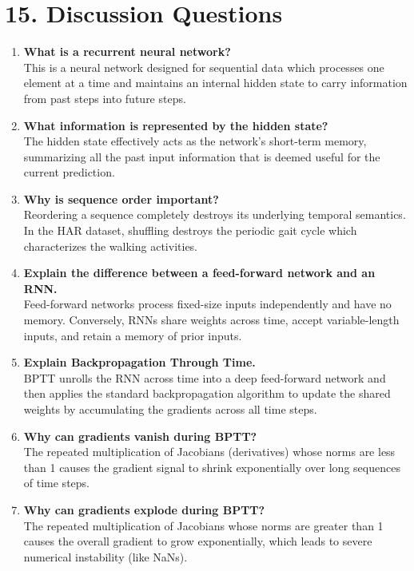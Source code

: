 \documentclass[10pt]{article}
\begin{document}
\section*{15. Discussion Questions}
\begin{enumerate}[itemsep=0.15cm]
    \item {\small \textbf{What is a recurrent neural network?}} \\[0.1cm]
This is a neural network designed for sequential data which processes one element at a time and maintains an internal hidden state to carry information from past steps into future steps.
    \item {\small \textbf{What information is represented by the hidden state?}} \\[0.1cm]
The hidden state effectively acts as the network's short-term memory, summarizing all the past input information that is deemed useful for the current prediction.
    \item {\small \textbf{Why is sequence order important?}} \\[0.1cm]
Reordering a sequence completely destroys its underlying temporal semantics. In the HAR dataset, shuffling destroys the periodic gait cycle which characterizes the walking activities.
    \item {\small \textbf{Explain the difference between a feed-forward network and an RNN.}} \\[0.1cm]
Feed-forward networks process fixed-size inputs independently and have no memory. Conversely, RNNs share weights across time, accept variable-length inputs, and retain a memory of prior inputs.
    \item {\small \textbf{Explain Backpropagation Through Time.}} \\[0.1cm]
BPTT unrolls the RNN across time into a deep feed-forward network and then applies the standard backpropagation algorithm to update the shared weights by accumulating the gradients across all time steps.
    \item {\small \textbf{Why can gradients vanish during BPTT?}} \\[0.1cm]
The repeated multiplication of Jacobians (derivatives) whose norms are less than 1 causes the gradient signal to shrink exponentially over long sequences of time steps.
    \item {\small \textbf{Why can gradients explode during BPTT?}} \\[0.1cm]
The repeated multiplication of Jacobians whose norms are greater than 1 causes the overall gradient to grow exponentially, which leads to severe numerical instability (like NaNs).

\end{enumerate}
\end{document}
